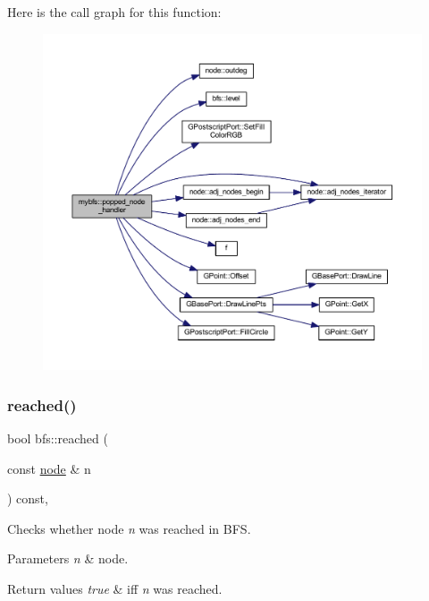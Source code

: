 Here is the call graph for this function\+:\nopagebreak
\begin{figure}[H]
\begin{center}
\leavevmode
\includegraphics[width=350pt]{classmybfs_a9d6e9e39f16d92ce1bcf368fe92b6856_cgraph}
\end{center}
\end{figure}
\mbox{\label{classbfs_ab1a7882a7d56e0e72bbe1a344381bdae}} 
\subsubsection{\texorpdfstring{reached()}{reached()}}
{\footnotesize\ttfamily bool bfs\+::reached (\begin{DoxyParamCaption}\item[{const \mbox{\hyperlink{classnode}{node}} \&}]{n }\end{DoxyParamCaption}) const\hspace{0.3cm}{\ttfamily [inline]}, {\ttfamily [inherited]}}



Checks whether node {\itshape n} was reached in B\+FS. 


\begin{DoxyParams}{Parameters}
{\em n} & node. \\
\hline
\end{DoxyParams}

\begin{DoxyRetVals}{Return values}
{\em true} & iff {\itshape n} was reached. \\
\hline
\end{DoxyRetVals}


